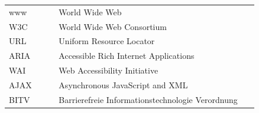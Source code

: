 \documentclass[a4paper,bibtotoc,oneside]{scrbook}
\begin{document}
\hspace{-17mm}\begin{tabular}{>{\raggedleft}p{0.2\linewidth} p{0.75\linewidth} p{0.1\linewidth}}

www & World Wide Web\\
W3C & World Wide Web Consortium\\
URL & Uniform Resource Locator\\
ARIA & Accessible Rich Internet Applications\\
WAI & Web Accessibility Initiative\\
AJAX & Asynchronous JavaScript and XML\\
BITV & Barrierefreie  Informationstechnologie Verordnung\\
\end{tabular}


\end{document}
